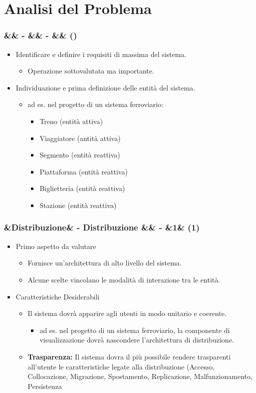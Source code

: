 \documentclass[slidestop,compress,blackandwhite]{beamer}
\newcommand{\itemB}[3]{
	\item \textbf{#1} #2 \vspace{#3}
}
\newcommand{\newtitle}[4]{
	#1 
	\ifx&#2&%
	\else
  		\large- #2
	\fi
	\ifx&#3&%
	\else
  		\normalsize- #3
	\fi
	\ifx&#4&%
	\else
  		\normalsize (#4)
	\fi
}
\newcommand{\newframe}[5]{
	\begin{frame}
		\frametitle{\newtitle{#1}{#2}{#3}{#4}}
		#5
	\end{frame}
}
\newcommand{\myitemize}[1]{
	\begin{itemize}\itemsep4pt
	#1
	\end{itemize}
}
\begin{document}
\section{Analisi del Problema}\label{analisis}
	\newframe{}{}{}{}{
		\myitemize {
			\item Identificare e definire i requisiti di massima del sistema.
				\myitemize{
					\item Operazione sottovalutata ma importante.
				}
			\item Individuazione e prima definizione delle entità del sistema.
				\myitemize {
					\item ad es. nel progetto di un sistema ferroviario:
						\myitemize{
							\item Treno (entità attiva)
							\item Viaggiatore (antità attiva)
							\item Segmento (entità reattiva)
							\item Piattaforma (entità reattiva)
							\item Biglietteria (entità reattiva)
							\item Stazione (entità reattiva)
						}
				}
		}
	}
	
	\newframe{}{Distribuzione}{}{1}{
		\myitemize {
			\item Primo aspetto da valutare
				\myitemize {
					\item Fornisce un'architettura di alto livello del sistema.
					\item Alcune scelte vincolano le modalità di interazione tra le entità.
				}
			\item Caratteristiche Desiderabili
				\myitemize {
					\item Il sistema dovrà apparire agli utenti in modo unitario e coerente. 
						\myitemize{
							\item ad es. nel progetto di un sistema ferroviario, la componente di visualizzazione dovrà nascondere l'architettura di distribuzione. 
						}
					\itemB{Trasparenza:}{Il sistema dovra il più possibile rendere trasparenti all'utente le caratteristiche legate alla distribuzione (Accesso, Collocazione, Migrazione, Spostamento, Replicazione, Malfunzionamento, Persistenza}{0.1cm}
				}
		}
	}
	
\end{document}
